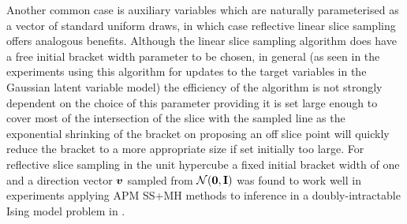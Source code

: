 Another common case is auxiliary variables which are naturally parameterised as a vector of standard uniform draws, in which case reflective linear slice sampling offers analogous benefits. Although the linear slice sampling algorithm does have a free initial bracket width parameter to be chosen, in general (as seen in the experiments using this algorithm for updates to the target variables in the Gaussian latent variable model) the efficiency of the algorithm is not strongly dependent on the choice of this parameter providing it is set large enough to cover most of the intersection of the slice with the sampled line as the exponential shrinking of the bracket on proposing an off slice point will quickly reduce the bracket to a more appropriate size if set initially too large. For reflective slice sampling in the unit hypercube a fixed initial bracket width of one and a direction vector $\boldsymbol{v}$ sampled from $\nrm{\vct{0},\mathbf{I}}$ was found to work well in experiments applying \ac{APM} \ac{SS}+\ac{MH} methods to inference in a doubly-intractable Ising model problem in \citep{murray2016pseudo}.

